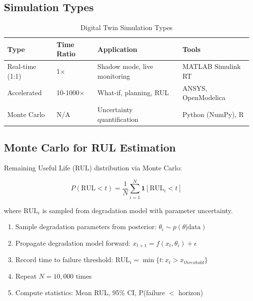 \documentclass[12pt,a4paper]{article}
\begin{document}
\subsection{Simulation Types}

\begin{table}[H]
\centering
\caption{Digital Twin Simulation Types}
\begin{tabular}{llll}
\toprule
\textbf{Type} & \textbf{Time Ratio} & \textbf{Application} & \textbf{Tools} \\
\midrule
Real-time (1:1) & 1$\times$ & Shadow mode, live monitoring & MATLAB Simulink RT \\
Accelerated & 10-1000$\times$ & What-if, planning, RUL & ANSYS, OpenModelica \\
Monte Carlo & N/A & Uncertainty quantification & Python (NumPy), R \\
\bottomrule
\end{tabular}
\end{table}

\subsection{Monte Carlo for RUL Estimation}

Remaining Useful Life (RUL) distribution via Monte Carlo:

\begin{equation}
P(\text{RUL} < t) = \frac{1}{N}\sum_{i=1}^{N} \mathbf{1}[\text{RUL}_i < t]
\end{equation}

where $\text{RUL}_i$ is sampled from degradation model with parameter uncertainty.

\begin{tcolorbox}[colback=virtualpur!10, colframe=virtualpur, title=Monte Carlo RUL Algorithm]
\begin{enumerate}
    \item Sample degradation parameters from posterior: $\theta_i \sim p(\theta | \text{data})$
    \item Propagate degradation model forward: $x_{t+1} = f(x_t, \theta_i) + \epsilon$
    \item Record time to failure threshold: $\text{RUL}_i = \min\{t : x_t > x_{threshold}\}$
    \item Repeat $N = 10,000$ times
    \item Compute statistics: Mean RUL, 95\% CI, P(failure $<$ horizon)
\end{enumerate}
\end{tcolorbox}
\end{document}

